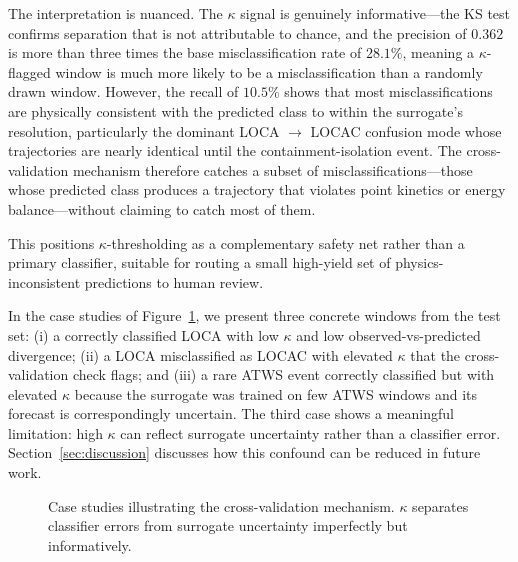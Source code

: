 The interpretation is nuanced. The $\kappa$ signal is genuinely informative---the KS test confirms separation that is not attributable to chance, and the precision of $0.362$ is more than three times the base misclassification rate of $28.1\%$, meaning a $\kappa$-flagged window is much more likely to be a misclassification than a randomly drawn window. However, the recall of $10.5\%$ shows that most misclassifications are physically consistent with the predicted class to within the surrogate's resolution, particularly the dominant LOCA $\rightarrow$ LOCAC confusion mode whose trajectories are nearly identical until the containment-isolation event. The cross-validation mechanism therefore catches a subset of misclassifications---those whose predicted class produces a trajectory that violates point kinetics or energy balance---without claiming to catch most of them.

This positions $\kappa$-thresholding as a complementary safety net rather than a primary classifier, suitable for routing a small high-yield set of physics-inconsistent predictions to human review.

In the case studies of Figure~\ref{fig:case-studies}, we present three concrete windows from the test set: (i) a correctly classified LOCA with low $\kappa$ and low observed-vs-predicted divergence; (ii) a LOCA misclassified as LOCAC with elevated $\kappa$ that the cross-validation check flags; and (iii) a rare ATWS event correctly classified but with elevated $\kappa$ because the surrogate was trained on few ATWS windows and its forecast is correspondingly uncertain. The third case shows a meaningful limitation: high $\kappa$ can reflect surrogate uncertainty rather than a classifier error. Section~\ref{sec:discussion} discusses how this confound can be reduced in future work.

\begin{figure}[H]
    \centering
    \caption{Case studies illustrating the cross-validation mechanism. $\kappa$ separates classifier errors from surrogate uncertainty imperfectly but informatively.}
    \label{fig:case-studies}
\end{figure}
